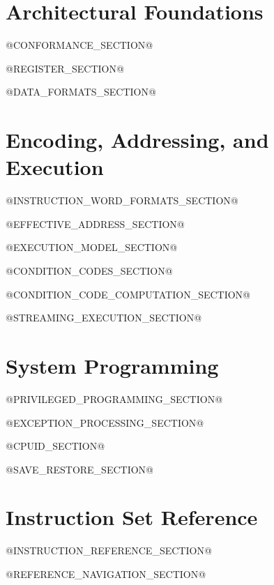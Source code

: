 


\clearpage
\thispagestyle{empty}
\vspace*{1.45in}
\part{Architectural Foundations}\label{part:architectural-foundations}
\vspace*{\fill}
\clearpage




@CONFORMANCE_SECTION@

@REGISTER_SECTION@

@DATA_FORMATS_SECTION@

\clearpage
\thispagestyle{empty}
\vspace*{1.45in}
\part{Encoding, Addressing, and Execution}\label{part:encoding-addressing-and-execution}
\vspace*{\fill}
\clearpage

@INSTRUCTION_WORD_FORMATS_SECTION@

@EFFECTIVE_ADDRESS_SECTION@



@EXECUTION_MODEL_SECTION@

@CONDITION_CODES_SECTION@

@CONDITION_CODE_COMPUTATION_SECTION@



@STREAMING_EXECUTION_SECTION@

\clearpage
\thispagestyle{empty}
\vspace*{1.45in}
\part{System Programming}\label{part:system-programming}
\vspace*{\fill}
\clearpage

@PRIVILEGED_PROGRAMMING_SECTION@

@EXCEPTION_PROCESSING_SECTION@

@CPUID_SECTION@

@SAVE_RESTORE_SECTION@

\clearpage
\thispagestyle{empty}
\vspace*{1.45in}
\part{Instruction Set Reference}\label{part:instruction-set-reference}
\vspace*{\fill}
\clearpage

@INSTRUCTION_REFERENCE_SECTION@

@REFERENCE_NAVIGATION_SECTION@


